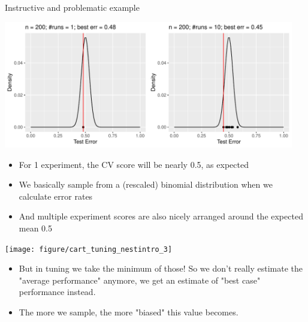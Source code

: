 \documentclass[11pt,compress,t,notes=noshow, xcolor=table]{beamer}
\newenvironment{knitrout}{}{} %
\begin{document}
\begin{vbframe}{Instructive and problematic example}
\begin{knitrout}\scriptsize
{}\color{fgcolor}

{\centering \includegraphics[width=0.95\textwidth]{figure/cart_tuning_nestintro_2} 

}



\end{knitrout}

\begin{itemize}
\item For 1 experiment, the CV score will be nearly 0.5, as expected
\item We basically sample from a (rescaled) binomial distribution when we calculate error rates
\item And multiple experiment scores are also nicely arranged around the expected mean 0.5
\end{itemize}

\framebreak

\begin{knitrout}\scriptsize
{}\color{fgcolor}

{\centering \texttt{[image: figure/cart\_tuning\_nestintro\_3]} 

}



\end{knitrout}

\begin{itemize}
\item But in tuning we take the minimum of those! So we don't really estimate the "average performance" anymore, we get an estimate of "best case" performance instead.
\item The more we sample, the more "biased" this value becomes. 
\end{itemize}
\end{vbframe}
\end{document}
